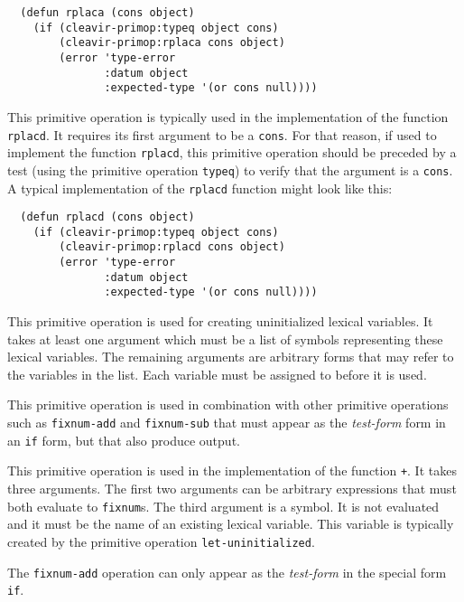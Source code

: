\begin{verbatim}
  (defun rplaca (cons object)
    (if (cleavir-primop:typeq object cons)
        (cleavir-primop:rplaca cons object)
        (error 'type-error
               :datum object
               :expected-type '(or cons null))))
\end{verbatim}


This primitive operation is typically used in the implementation of
the \commonlisp{} function \texttt{rplacd}.  It requires its first
argument to be a \texttt{cons}.  For that reason, if used to implement
the \commonlisp{} function \texttt{rplacd}, this primitive operation
should be preceded by a test (using the primitive operation
\texttt{typeq}) to verify that the argument is a \texttt{cons}.  A
typical implementation of the \texttt{rplacd} function might look like
this:

\begin{verbatim}
  (defun rplacd (cons object)
    (if (cleavir-primop:typeq object cons)
        (cleavir-primop:rplacd cons object)
        (error 'type-error
               :datum object
               :expected-type '(or cons null))))
\end{verbatim}


This primitive operation is used for creating uninitialized lexical
variables.  It takes at least one argument which must be a list of
symbols representing these lexical variables.  The remaining arguments
are arbitrary forms that may refer to the variables in the list.  Each
variable must be assigned to before it is used.

This primitive operation is used in combination with other primitive
operations such as \texttt{fixnum-add} and \texttt{fixnum-sub} that
must appear as the \emph{test-form} form in an \texttt{if} form, but
that also produce output.


This primitive operation is used in the implementation of the
\commonlisp{} function \texttt{+}.  It takes three arguments.  The
first two arguments can be arbitrary expressions that must both
evaluate to \texttt{fixnum}s.   The third argument is a symbol.  It is
not evaluated and it must be the name of an existing lexical
variable.  This variable is typically created by the primitive
operation \texttt{let-uninitialized}.

The \texttt{fixnum-add} operation can only appear as the
\emph{test-form} in the special form \texttt{if}.

